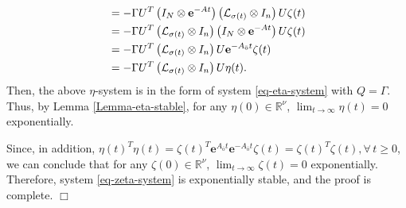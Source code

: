 \documentclass[twocolumn]{autart}
\newcommand{\RR}{\mathbb{R}}
\newenvironment{Proof}{\noindent{\em Proof:\/}}{\hfill $\Box$\par}
\begin{document}
\begin{Proof}
\begin{align*}
     &=-\Gamma U^{T}\left(I_{N} \otimes \mathbf{e}^{-At}\right)\left(\mathcal{L}_{\sigma(t)} \otimes I_{n}\right)U \zeta(t) \notag\\
     &=-\Gamma U^{T}\left(\mathcal{L}_{\sigma(t)} \otimes I_{n}\right)\left(I_{N} \otimes \mathbf{e}^{-At}\right)U \zeta(t) \notag \\
     &=-\Gamma U^{T}\left(\mathcal{L}_{\sigma(t)} \otimes I_{n}\right)U\mathbf{e}^{-A_{\bar{\text{o}}}t}\zeta(t) \notag\\
     &=-\Gamma U^{T}\left(\mathcal{L}_{\sigma(t)} \otimes I_{n}\right)U\eta(t).
  \end{align*}
Then, the above $\eta$-system is in the form of system \eqref{eq-eta-system} with $Q=\Gamma$.
Thus, by Lemma \ref{Lemma-eta-stable}, for any $\eta(0)\in \RR^{\nu}$,
$\lim_{t\to\infty}\eta(t)=0$ exponentially.

Since, in addition,
$\eta(t)^{T}\eta(t)=\zeta(t)^{T}\mathbf{e}^{A_{\bar{\text{o}}}t}\mathbf{e}^{-A_{\bar{\text{o}}}t}\zeta(t)=\zeta(t)^{T}\zeta(t),
\forall\, t\ge 0$,
we can conclude that for any $\zeta(0)\in \RR^{\nu}$,
$\lim_{t\to\infty}\zeta(t)=0$ exponentially.
Therefore, system \eqref{eq-zeta-system} is exponentially stable,
and the proof is complete.
\end{Proof}
\end{document}
